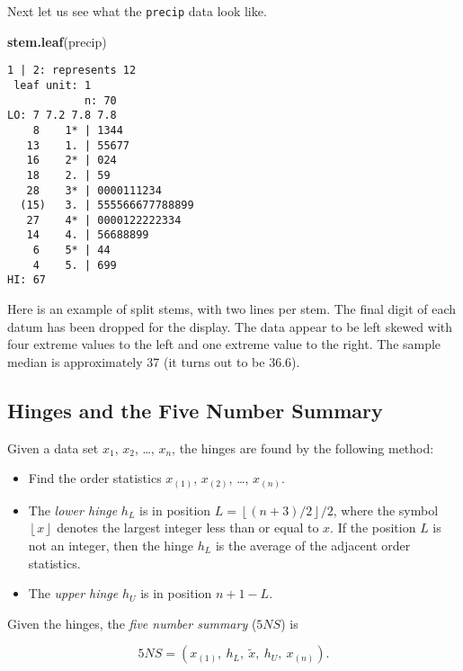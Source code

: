 \documentclass[]{book}
\newenvironment{Shaded}{\begin{snugshade}}{\end{snugshade}}
\newcommand{\KeywordTok}[1]{\textcolor[rgb]{0.13,0.29,0.53}{\textbf{{#1}}}}
\newcommand{\NormalTok}[1]{{#1}}
\numberwithin{equation}{chapter}
\numberwithin{figure}{chapter}
\theoremstyle{plain}
\theoremstyle{definition}
\theoremstyle{remark}
\theoremstyle{definition}
\theoremstyle{definition}
\theoremstyle{remark}
\begin{document}
Next let us see what the \texttt{precip} data look like.

\begin{Shaded}
\begin{Highlighting}[]
\KeywordTok{stem.leaf}\NormalTok{(precip)}
\end{Highlighting}
\end{Shaded}

\begin{verbatim}
1 | 2: represents 12
 leaf unit: 1
            n: 70
LO: 7 7.2 7.8 7.8
    8    1* | 1344
   13    1. | 55677
   16    2* | 024
   18    2. | 59
   28    3* | 0000111234
  (15)   3. | 555566677788899
   27    4* | 0000122222334
   14    4. | 56688899
    6    5* | 44
    4    5. | 699
HI: 67
\end{verbatim}

Here is an example of split stems, with two lines per stem. The final
digit of each datum has been dropped for the display. The data appear to
be left skewed with four extreme values to the left and one extreme
value to the right. The sample median is approximately 37 (it turns out
to be 36.6).

\subsection{Hinges and the Five Number
Summary}\label{sub-hinges-and-5NS}

Given a data set \(x_{1}\), \(x_{2}\), \ldots{}, \(x_{n}\), the hinges
are found by the following method:

\begin{itemize}
\item
  Find the order statistics \(x_{(1)}\), \(x_{(2)}\), \ldots{},
  \(x_{(n)}\).
\item
  The \emph{lower hinge} \(h_{L}\) is in position
  \(L=\left\lfloor (n+3)/2\right\rfloor / 2\), where the symbol
  \(\left\lfloor x\right\rfloor\) denotes the largest integer less than
  or equal to \(x\). If the position \(L\) is not an integer, then the
  hinge \(h_{L}\) is the average of the adjacent order statistics.
\item
  The \emph{upper hinge} \(h_{U}\) is in position \(n+1-L\).
\end{itemize}

Given the hinges, the \emph{five number summary} (\(5NS\)) is

\begin{equation} 
5NS=(x_{(1)},\ h_{L},\ \tilde{x},\ h_{U},\ x_{(n)}).
\end{equation}
\end{document}

